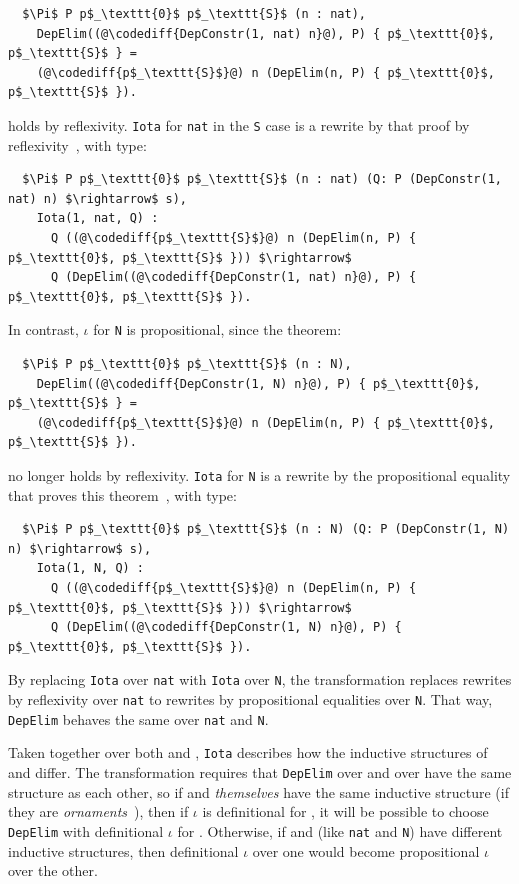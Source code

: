 \begin{lstlisting}
  $\Pi$ P p$_\texttt{0}$ p$_\texttt{S}$ (n : nat),
    DepElim((@\codediff{DepConstr(1, nat) n}@), P) { p$_\texttt{0}$, p$_\texttt{S}$ } =
    (@\codediff{p$_\texttt{S}$}@) n (DepElim(n, P) { p$_\texttt{0}$, p$_\texttt{S}$ }).
\end{lstlisting}
holds by reflexivity.
\lstinline{Iota} for \lstinline{nat} in the \lstinline{S} case is a rewrite by that proof by reflexivity~\href{https://github.com/uwplse/pumpkin-pi/blob/v2.0.0/plugin/coq/nonorn.v}{},
with type:

\begin{lstlisting}
  $\Pi$ P p$_\texttt{0}$ p$_\texttt{S}$ (n : nat) (Q: P (DepConstr(1, nat) n) $\rightarrow$ s),
    Iota(1, nat, Q) :
      Q ((@\codediff{p$_\texttt{S}$}@) n (DepElim(n, P) { p$_\texttt{0}$, p$_\texttt{S}$ })) $\rightarrow$
      Q (DepElim((@\codediff{DepConstr(1, nat) n}@), P) { p$_\texttt{0}$, p$_\texttt{S}$ }).
\end{lstlisting}
In contrast, $\iota$ for \lstinline{N} is propositional, since the 
theorem: %

\begin{lstlisting}
  $\Pi$ P p$_\texttt{0}$ p$_\texttt{S}$ (n : N),
    DepElim((@\codediff{DepConstr(1, N) n}@), P) { p$_\texttt{0}$, p$_\texttt{S}$ } =
    (@\codediff{p$_\texttt{S}$}@) n (DepElim(n, P) { p$_\texttt{0}$, p$_\texttt{S}$ }).
\end{lstlisting}
no longer holds by reflexivity.
\lstinline{Iota} for \lstinline{N} is a rewrite by the propositional equality that proves this theorem~\href{https://github.com/uwplse/pumpkin-pi/blob/v2.0.0/plugin/coq/nonorn.v}{},
with type:

\begin{lstlisting}
  $\Pi$ P p$_\texttt{0}$ p$_\texttt{S}$ (n : N) (Q: P (DepConstr(1, N) n) $\rightarrow$ s),
    Iota(1, N, Q) :
      Q ((@\codediff{p$_\texttt{S}$}@) n (DepElim(n, P) { p$_\texttt{0}$, p$_\texttt{S}$ })) $\rightarrow$
      Q (DepElim((@\codediff{DepConstr(1, N) n}@), P) { p$_\texttt{0}$, p$_\texttt{S}$ }).
\end{lstlisting}
By replacing \lstinline{Iota} over \lstinline{nat} with \lstinline{Iota} over \lstinline{N},
the transformation replaces rewrites by reflexivity over \lstinline{nat} to rewrites by propositional equalities over \lstinline{N}.
That way, \lstinline{DepElim} behaves the same over \lstinline{nat} and \lstinline{N}.

Taken together over both \Aa and \B, \lstinline{Iota} describes how the inductive structures of \Aa and \B differ.
The transformation requires that \lstinline{DepElim} over \Aa and over \B have the same structure
as each other, so if \Aa and \B \textit{themselves} have the same 
inductive structure (if they are \textit{ornaments}~\cite{mcbride}),
then if $\iota$ is definitional for \Aa, it will be possible to choose
\lstinline{DepElim} with definitional $\iota$ for \B.
Otherwise, if \Aa and \B (like \lstinline{nat} and \lstinline{N}) have different inductive structures,
then definitional $\iota$ over one would become propositional $\iota$ over the other.

